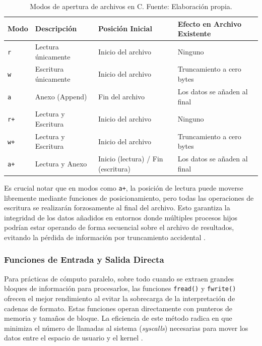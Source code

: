 \begin{table}[H]
\centering
\begin{tabular}{|p{2cm}|p{3.5cm}|p{3cm}|p{5cm}|}
\hline
\textbf{Modo} & \textbf{Descripción} & \textbf{Posición Inicial} & \textbf{Efecto en Archivo Existente} \\
\hline
\texttt{r} & Lectura únicamente & Inicio del archivo & Ninguno \\
\hline
\texttt{w} & Escritura únicamente & Inicio del archivo & Truncamiento a cero bytes \\
\hline
\texttt{a} & Anexo (Append) & Fin del archivo & Los datos se añaden al final \\
\hline
\texttt{r+} & Lectura y Escritura & Inicio del archivo & Ninguno \\
\hline
\texttt{w+} & Lectura y Escritura & Inicio del archivo & Truncamiento a cero bytes \\
\hline
\texttt{a+} & Lectura y Anexo & Inicio (lectura) / Fin (escritura) & Los datos se añaden al final \\
\hline
\end{tabular}
\caption{Modos de apertura de archivos en C. Fuente: Elaboración propia.}
\label{tab:modos_apertura}
\end{table}

Es crucial notar que en modos como \texttt{a+}, la posición de lectura puede moverse libremente mediante funciones de posicionamiento, pero todas las operaciones de escritura se realizarán forzosamente al final del archivo. Esto garantiza la integridad de los datos añadidos en entornos donde múltiples procesos hijos podrían estar operando de forma secuencial sobre el archivo de resultados, evitando la pérdida de información por truncamiento accidental \cite{glibc_manual}.

\subsubsection{Funciones de Entrada y Salida Directa}

Para prácticas de cómputo paralelo, sobre todo cuando se extraen grandes bloques de información para procesarlos, las funciones \texttt{fread()} y \texttt{fwrite()} ofrecen el mejor rendimiento al evitar la sobrecarga de la interpretación de cadenas de formato. Estas funciones operan directamente con punteros de memoria y tamaños de bloque. La eficiencia de este método radica en que minimiza el número de llamadas al sistema (\textit{syscalls}) necesarias para mover los datos entre el espacio de usuario y el kernel \cite{iso2024c, glibc_manual}.

